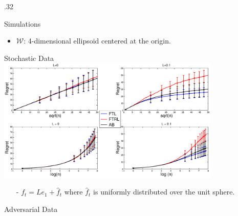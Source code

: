 \documentclass[final]{beamer} %
\newcommand{\cW}{\mathcal{W}}
\newcommand{\hf}{\hat{f}}
\begin{document}
\begin{frame}[c]
\begin{columns}[t,totalwidth=\textwidth]
\begin{column} {.32\textwidth}
		\vspace{0.0ex}
		\begin{block}{Simulations}	
		\vspace{-0.1cm}
		\begin{itemize}
			\item $\cW$: 4-dimensional ellipsoid centered at the origin.
		\end{itemize}
			\vspace{-0.5cm}	
			\begin{minipage}{.9\linewidth}
				\begin{block}{Stochastic Data}	
					\vspace{-0.4cm}
					\centering
					\includegraphics[width=0.8\textwidth]{figures/ExpResults/Stoc}	
					\smallskip
					\footnotesize
					\begin{itemize}
						\item[-] $f_t=L e_1 + \hf_t$ where $\hf_t$ is uniformly distributed over the unit sphere.
						\vspace{-1cm}
					\end{itemize}
				\end{block}	
				\bigskip
				\begin{block}{Adversarial Data}	
					\vspace{-0.4cm}

\end{block}
\end{minipage}
\end{block}
\end{column}
\end{columns}
\end{frame}
\end{document}
